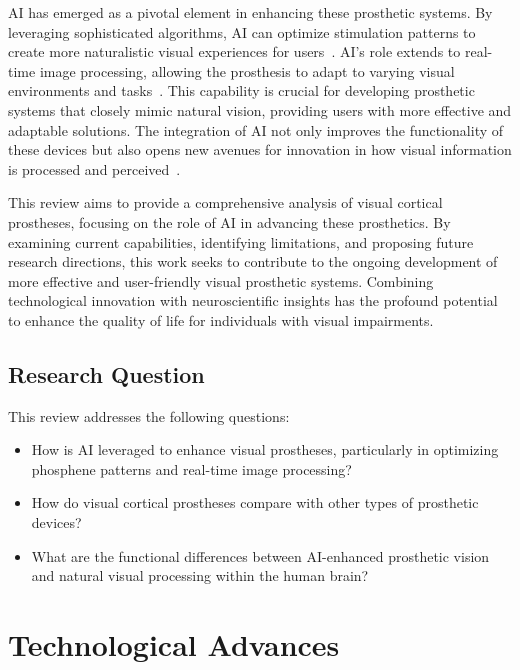 \documentclass[twocolumn,10pt]{article}
\begin{document}
AI has emerged as a pivotal element in enhancing these prosthetic systems. By
leveraging sophisticated algorithms, AI can optimize stimulation patterns to
create more naturalistic visual experiences for
users~\cite{kriegeskorteDeepNeuralNetworks2015}. AI's role extends to real-time
image processing, allowing the prosthesis to adapt to varying visual
environments and tasks~\cite{marblestoneIntegrationDeepLearning2016}. This
capability is crucial for developing prosthetic systems that closely mimic
natural vision, providing users with more effective and adaptable solutions. The
integration of AI not only improves the functionality of these devices but also
opens new avenues for innovation in how visual information is processed and
perceived~\cite{gallettiCorticalConnectionsArea2001}.

This review aims to provide a comprehensive analysis of visual cortical
prostheses, focusing on the role of AI in advancing these prosthetics. By
examining current capabilities, identifying limitations, and proposing future
research directions, this work seeks to contribute to the ongoing development of
more effective and user-friendly visual prosthetic systems. Combining
technological innovation with neuroscientific insights has the profound
potential to enhance the quality of life for individuals with visual
impairments.

\subsection{Research Question}
This review addresses the following questions:
\begin{itemize}
      \item How is AI leveraged to enhance visual prostheses, particularly in
            optimizing phosphene patterns and real-time image
            processing?
      \item How do visual cortical prostheses compare with other types of
            prosthetic devices?
      \item What are the functional differences between AI-enhanced prosthetic
            vision and natural visual processing within the human brain?
\end{itemize}

\section{Technological Advances}\label{sec:tech_advances}
\end{document}
